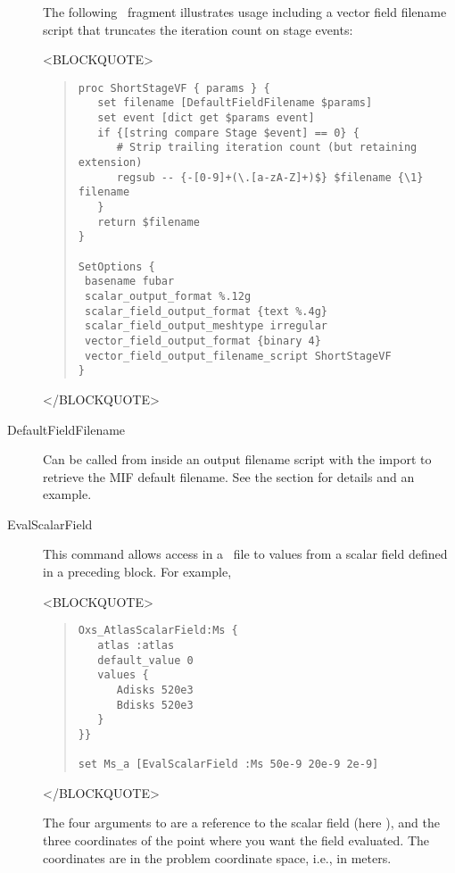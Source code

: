 \begin{description}
The following \MIF\ fragment illustrates  usage including
a vector field filename script that truncates the iteration count on
stage events:
\begin{rawhtml}
<BLOCKQUOTE>
\end{rawhtml}
\begin{quote}
\begin{verbatim}
proc ShortStageVF { params } {
   set filename [DefaultFieldFilename $params]
   set event [dict get $params event]
   if {[string compare Stage $event] == 0} {
      # Strip trailing iteration count (but retaining extension)
      regsub -- {-[0-9]+(\.[a-zA-Z]+)$} $filename {\1} filename
   }
   return $filename
}

SetOptions {
 basename fubar
 scalar_output_format %.12g
 scalar_field_output_format {text %.4g}
 scalar_field_output_meshtype irregular
 vector_field_output_format {binary 4}
 vector_field_output_filename_script ShortStageVF
}
\end{verbatim}
\end{quote}
\begin{rawhtml}
</BLOCKQUOTE>
\end{rawhtml}

\item[DefaultFieldFilename]%
Can be called from inside an output filename script with
the  import to retrieve the MIF default filename. See the
 section for details and an
example.

\item[EvalScalarField]
This command allows access in a \MIF\ file to values from a scalar field
defined in a preceding  block.  For example,
\begin{rawhtml}
<BLOCKQUOTE>
\end{rawhtml}
\begin{quote}
\begin{verbatim}
Oxs_AtlasScalarField:Ms {
   atlas :atlas
   default_value 0
   values {
      Adisks 520e3
      Bdisks 520e3
   }
}}

set Ms_a [EvalScalarField :Ms 50e-9 20e-9 2e-9]
\end{verbatim}
\end{quote}
\begin{rawhtml}
</BLOCKQUOTE>
\end{rawhtml}
The four arguments to  are a reference to the scalar
field (here ), and the three coordinates of the point where you
want the field evaluated.  The coordinates are in the problem coordinate
space, i.e., in meters.


\end{description}
